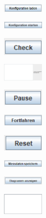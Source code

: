 \documentclass[parskip=full]{scrartcl}
\begin{document}
\begin{center}
    \includegraphics[width = 2cm]{Grafiken/5-Konfiguration_laden.png}
\end{center}

\begin{center}
    \includegraphics[width = 2cm]{Grafiken/6-Konfiguration_starten.png}
\end{center}

\begin{center}
    \includegraphics[width = 2cm]{Grafiken/7-Check.png}
\end{center}

\begin{center}
    \includegraphics[width = 2cm]{Grafiken/8-Editor.png}
\end{center}

\begin{center}
    \includegraphics[width = 2cm]{Grafiken/9-Pause.png}
\end{center}

\begin{center}
    \includegraphics[width = 2cm]{Grafiken/10-Fortfahren.png}
\end{center}

\begin{center}
    \includegraphics[width = 2cm]{Grafiken/11-Reset.png}
\end{center}

\begin{center}
    \includegraphics[width = 2cm]{Grafiken/12-Messdaten_speichern.png}
\end{center}

\begin{center}
    \includegraphics[width = 2cm]{Grafiken/13-Diagramm_anzeigen.png}
\end{center}

\begin{center}
    \includegraphics[width = 2cm]{Grafiken/14-Datenanzeige.png}
\end{center}
\end{document}
